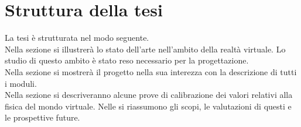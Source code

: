 \section{Struttura della tesi}
%
%
%
%
%

\noindent La tesi è strutturata nel modo seguente.\\
Nella sezione \textit{} si illustrerà lo stato dell'arte nell'ambito della realtà virtuale. Lo studio di questo ambito è stato reso necessario per la progettazione.\\
\noindent Nella sezione \textit{} si mostrerà il progetto nella sua interezza con la descrizione di tutti i moduli.\\
\noindent Nella sezione \textit{} si descriveranno alcune prove di calibrazione dei valori relativi alla fisica del mondo virtuale.
\noindent Nelle \textit{} si riassumono gli scopi, le valutazioni di questi e le prospettive future.







